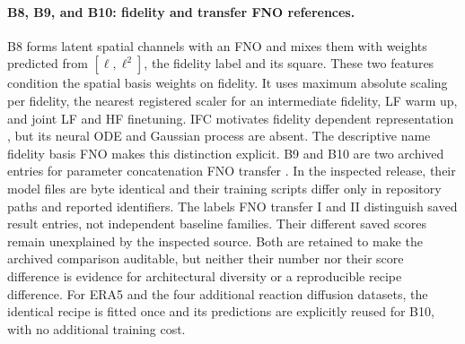 \paragraph{B8, B9, and B10: fidelity and transfer FNO references.}
B8 forms latent spatial channels with an FNO and mixes them with weights predicted
from $[\ell,\ell^2]$, the fidelity label and its square. These two features
condition the spatial basis weights on fidelity. It uses maximum absolute scaling
per fidelity, the nearest registered scaler for an intermediate fidelity, LF
warm up, and joint LF and HF finetuning. IFC motivates fidelity dependent
representation \citep{li2022ifc}, but its neural ODE and Gaussian process are
absent. The descriptive name fidelity basis FNO makes this distinction explicit.
B9 and B10 are two archived entries for parameter concatenation FNO transfer
\citep{lyu2023}. In the inspected release, their model files are byte identical
and their training scripts differ only in repository paths and reported
identifiers. The labels FNO transfer I and II distinguish saved result entries,
not independent baseline families. Their different saved scores remain
unexplained by the inspected source. Both are retained to make the archived
comparison auditable, but neither their number nor their score difference is
evidence for architectural diversity or a reproducible recipe difference.
For ERA5 and the four additional reaction diffusion datasets, the identical
recipe is fitted once and its predictions are explicitly reused for B10,
with no additional training cost.
